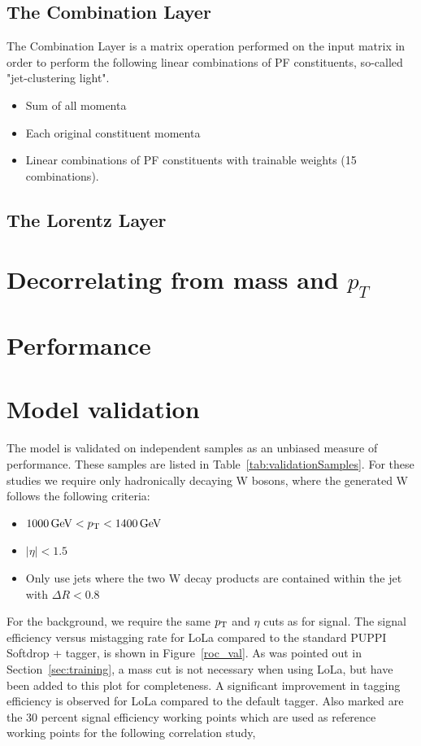 \subsection{The Combination Layer}
\label{sec:cola}
The Combination Layer is a matrix operation performed on the input matrix in order to perform the following linear combinations of PF constituents, so-called "jet-clustering light".
\begin{itemize}
\item Sum of all momenta
\item Each original constituent momenta
\item Linear combinations of PF constituents with trainable weights (15 combinations).
\end{itemize}
\subsection{The Lorentz Layer}
\section{Decorrelating from mass and $p_{T}$}
\section{Performance}
\section{Model validation}
\label{sec:validation}

The model is validated on independent samples as an unbiased measure of performance. These samples are listed in Table~\ref{tab:validationSamples}.
For these studies we require only hadronically decaying W bosons, where the generated W follows the following criteria:
\begin{itemize}
\item $ 1000 \,\text{Ge\hspace{-.08em}V} < p_{\mathrm{T}} < 1400 \,\text{Ge\hspace{-.08em}V}$
\item $|\eta| < 1.5$
\item Only use jets where the two W decay products are contained within the jet with $\Delta R < 0.8$
\end{itemize}
For the background, we require the same $p_{\mathrm{T}}$ and $\eta$ cuts as for signal. The signal efficiency versus mistagging rate for LoLa compared to
the standard PUPPI Softdrop + \nsubj tagger, is shown in Figure~\ref{roc_val}. As was pointed out in Section~\ref{sec:training}, a mass cut is not necessary when using LoLa, but have been added to this plot for completeness. A significant improvement in tagging efficiency is observed for LoLa compared to the default tagger. Also marked are the 30 percent signal efficiency working points which are used as reference working points for the following correlation study,


